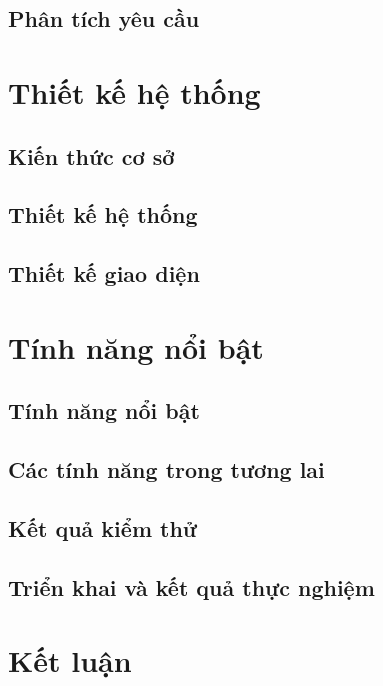 \documentclass{report}
\begin{document}
\section{Phân tích yêu cầu}


\chapter{Thiết kế hệ thống}


\section{Kiến thức cơ sở}

\section{Thiết kế hệ thống}

\section{Thiết kế giao diện}

\chapter{Tính năng nổi bật}

\section{Tính năng nổi bật}

\section{Các tính năng trong tương lai}

\section{Kết quả kiểm thử}

\section{Triển khai và kết quả thực nghiệm}

\chapter{Kết luận}
\end{document}
